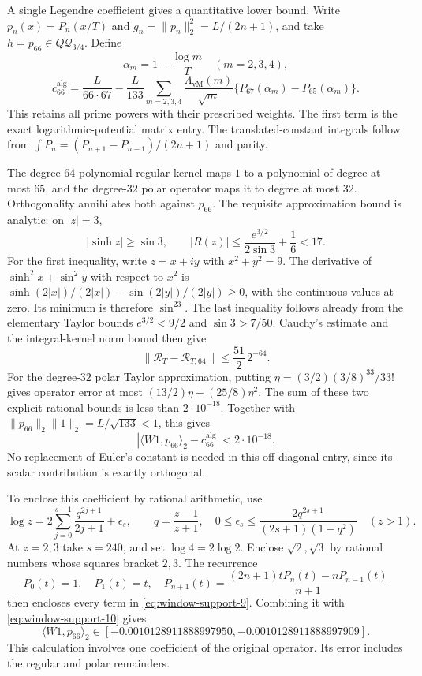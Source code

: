 A single Legendre coefficient gives a quantitative lower bound.  Write
$p_n(x)=P_n(x/T)$ and $g_n=\|p_n\|_2^2=L/(2n+1)$, and
take $h=p_{66}\in Q\mathcal Q_{3/4}$.  Define
\[
 \alpha_m=1-\frac{\log m}{T}\quad(m=2,3,4),
\]
\begin{equation}
 c_{66}^{\mathrm{alg}}=
 \frac{L}{66\cdot67}
 -\frac{L}{133}\sum_{m=2,3,4}
       \frac{\Lambda_{\mathrm{vM}}(m)}{\sqrt m}
       \{P_{67}(\alpha_m)-P_{65}(\alpha_m)\}.
 \label{eq:window-support-9}
\end{equation}
This retains all prime powers with their prescribed weights.
The first term is the exact logarithmic-potential matrix
entry.  The translated-constant integrals follow from
$\int P_n=(P_{n+1}-P_{n-1})/(2n+1)$ and parity.

The degree-$64$ polynomial regular kernel maps $1$ to a
polynomial of degree at most $65$, and the degree-$32$ polar
operator maps it to degree at most $32$.  Orthogonality
annihilates both against $p_{66}$.  The requisite approximation
bound is analytic: on $|z|=3$,
\[
 |\sinh z|\ge\sin3,\qquad
 |R(z)|\le\frac{e^{3/2}}{2\sin3}+\frac16<17.
\]
For the first inequality, write $z=x+iy$ with $x^2+y^2=9$.
The derivative of $\sinh^2x+\sin^2y$ with respect to $x^2$
is $\sinh(2|x|)/(2|x|)-\sin(2|y|)/(2|y|)\ge0$, with the
continuous values at zero.  Its minimum is therefore $\sin^23$.
The last inequality follows already from the elementary Taylor
bounds $e^{3/2}<9/2$ and $\sin3>7/50$.  Cauchy's estimate and
the integral-kernel norm bound then give
\[
 \|\mathcal R_T-\mathcal R_{T,64}\|
 \le\frac{51}{2}\,2^{-64}.
\]
For the degree-$32$ polar Taylor approximation, putting
$\eta=(3/2)(3/8)^{33}/33!$ gives operator error at most
$(13/2)\eta+(25/8)\eta^2$.  The sum of these two explicit
rational bounds is less than $2\cdot10^{-18}$.  Together with
$\|p_{66}\|_2\|1\|_2=L/\sqrt{133}<1$, this gives
\begin{equation}
 |\langle W1,p_{66}\rangle_2-c_{66}^{\mathrm{alg}}|<2\cdot10^{-18}.
 \label{eq:window-support-10}
\end{equation}
No replacement of Euler's constant is needed in this off-diagonal
entry, since its scalar contribution is exactly orthogonal.

To enclose this coefficient by rational arithmetic, use
\[
 \log z=2\sum_{j=0}^{s-1}\frac{q^{2j+1}}{2j+1}+\epsilon_s,
 \qquad q=\frac{z-1}{z+1},\quad
 0\le\epsilon_s\le\frac{2q^{2s+1}}{(2s+1)(1-q^2)}
 \quad(z>1).
\]
At $z=2,3$ take $s=240$, and set $\log4=2\log2$.
Enclose $\sqrt2,\sqrt3$ by rational numbers whose squares
bracket $2,3$.  The recurrence
\[
 P_0(t)=1,\quad P_1(t)=t,\quad
 P_{n+1}(t)=\frac{(2n+1)tP_n(t)-nP_{n-1}(t)}{n+1}
\]
then encloses every term in \eqref{eq:window-support-9}.  Combining it with \eqref{eq:window-support-10} gives
\begin{equation}
 \langle W1,p_{66}\rangle_2
 \in[-0.0010128911888997950,
       -0.0010128911888997909].
 \label{eq:window-support-11}
\end{equation}
This calculation involves one coefficient of the original operator.
Its error includes the regular and polar remainders.

